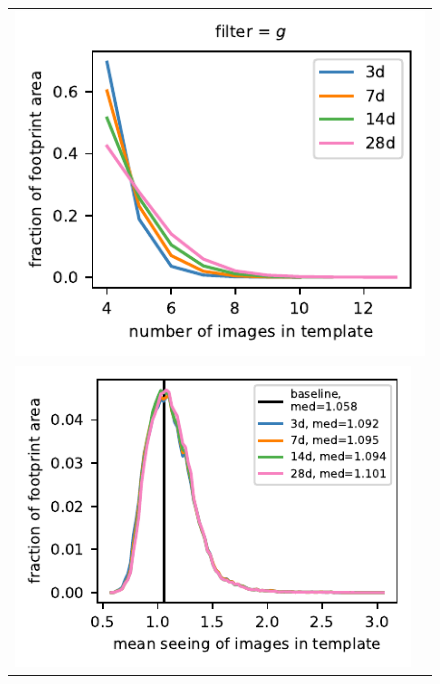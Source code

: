 \documentclass[preprintm,linenumbers]{aastex631}
\begin{document}
  \begin{figure}[h]
			\centering
%				
%				
		
							\begin{tabular}{@{}c@{}c@{}}
			\multicolumn{2}{c}{\includegraphics{results/histograms_templates_tscale/hist_first_year_one_snap_v4_0_10yrs_db_noDD_noTwi_doALLTemplateMetrics_reduceNTemplate_g_noDD_noTwi.pdf}} \\
					\includegraphics{results/histograms_templates_tscale/hist_first_year_one_snap_v4_0_10yrs_db_noDD_noTwi_doALLTemplateMetrics_reduceSeeingTemplate_g_noDD_noTwi.pdf} &

\end{tabular}
\end{figure}
\end{document}
